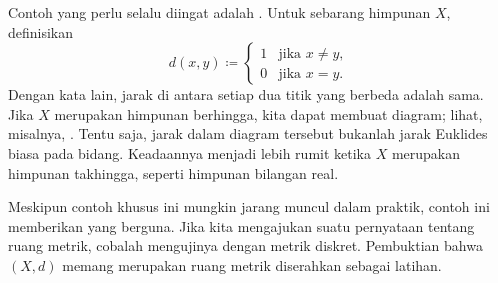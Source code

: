 \begin{example}
Contoh yang perlu selalu diingat adalah
\emph{}.
Untuk sebarang himpunan $X$, definisikan
\begin{equation*}
d(x,y) \coloneqq
\begin{cases}
1 & \text{jika } x \neq y, \\
0 & \text{jika } x = y.
\end{cases}
\end{equation*}
Dengan kata lain, jarak di antara setiap dua titik yang berbeda adalah sama.  Jika $X$
merupakan himpunan berhingga, kita dapat membuat diagram; lihat, misalnya,
.  Tentu saja, jarak dalam diagram tersebut
bukanlah jarak Euklides biasa pada bidang.
Keadaannya menjadi lebih rumit ketika $X$ merupakan himpunan takhingga,
seperti himpunan bilangan real.
\begin{myfigureht}
\caption{Contoh ruang metrik diskret $\{ a,b,c,d,e \}$; jarak
di antara setiap dua titik yang berbeda adalah $1$.\label{fig:msdiscmetric}}
\end{myfigureht}

Meskipun contoh khusus ini mungkin jarang muncul dalam praktik, contoh ini
memberikan  yang berguna.  Jika kita mengajukan suatu
pernyataan tentang ruang metrik, cobalah mengujinya dengan metrik diskret.
Pembuktian bahwa $(X,d)$ memang merupakan ruang metrik diserahkan sebagai latihan.
\end{example}

